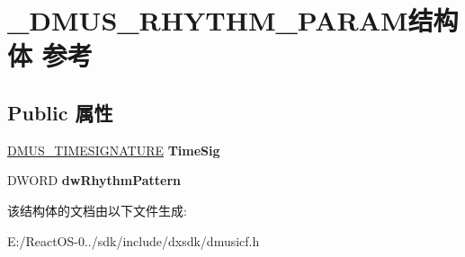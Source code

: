 \hypertarget{struct___d_m_u_s___r_h_y_t_h_m___p_a_r_a_m}{}\section{\+\_\+\+D\+M\+U\+S\+\_\+\+R\+H\+Y\+T\+H\+M\+\_\+\+P\+A\+R\+A\+M结构体 参考}
\label{struct___d_m_u_s___r_h_y_t_h_m___p_a_r_a_m}
\subsection*{Public 属性}
\begin{DoxyCompactItemize}
\item 
\mbox{\label{struct___d_m_u_s___r_h_y_t_h_m___p_a_r_a_m_aa33b072732de0681afe264e0323f56e9}} 
\hyperlink{struct___d_m_u_s___t_i_m_e_s_i_g_n_a_t_u_r_e}{D\+M\+U\+S\+\_\+\+T\+I\+M\+E\+S\+I\+G\+N\+A\+T\+U\+RE} {\bfseries Time\+Sig}
\item 
\mbox{\label{struct___d_m_u_s___r_h_y_t_h_m___p_a_r_a_m_a839155d4556ff60d1c8e9321db30a1ed}} 
D\+W\+O\+RD {\bfseries dw\+Rhythm\+Pattern}
\end{DoxyCompactItemize}


该结构体的文档由以下文件生成\+:\begin{DoxyCompactItemize}
\item 
E\+:/\+React\+O\+S-\/0../sdk/include/dxsdk/dmusicf.\+h\end{DoxyCompactItemize}
